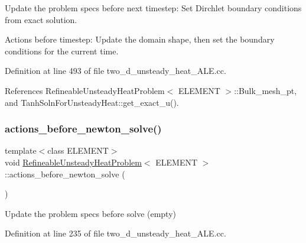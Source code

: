 Update the problem specs before next timestep\+: Set Dirchlet boundary conditions from exact solution. 

Actions before timestep\+: Update the domain shape, then set the boundary conditions for the current time. 

Definition at line 493 of file two\+\_\+d\+\_\+unsteady\+\_\+heat\+\_\+\+A\+L\+E.\+cc.



References Refineable\+Unsteady\+Heat\+Problem$<$ E\+L\+E\+M\+E\+N\+T $>$\+::\+Bulk\+\_\+mesh\+\_\+pt, and Tanh\+Soln\+For\+Unsteady\+Heat\+::get\+\_\+exact\+\_\+u().

\mbox{\label{classRefineableUnsteadyHeatProblem_aac1935e15c67b196e6db97dd058511b5}} 
\subsubsection{\texorpdfstring{actions\+\_\+before\+\_\+newton\+\_\+solve()}{actions\_before\_newton\_solve()}}
{\footnotesize\ttfamily template$<$class E\+L\+E\+M\+E\+NT$>$ \\
void \hyperlink{classRefineableUnsteadyHeatProblem}{Refineable\+Unsteady\+Heat\+Problem}$<$ E\+L\+E\+M\+E\+NT $>$\+::actions\+\_\+before\+\_\+newton\+\_\+solve (\begin{DoxyParamCaption}{ }\end{DoxyParamCaption})\hspace{0.3cm}{\ttfamily [inline]}}



Update the problem specs before solve (empty) 



Definition at line 235 of file two\+\_\+d\+\_\+unsteady\+\_\+heat\+\_\+\+A\+L\+E.\+cc.

\mbox{\label{classRefineableUnsteadyHeatProblem_a4d8eec1505a3c53960a3182ec462b4e7}} 
